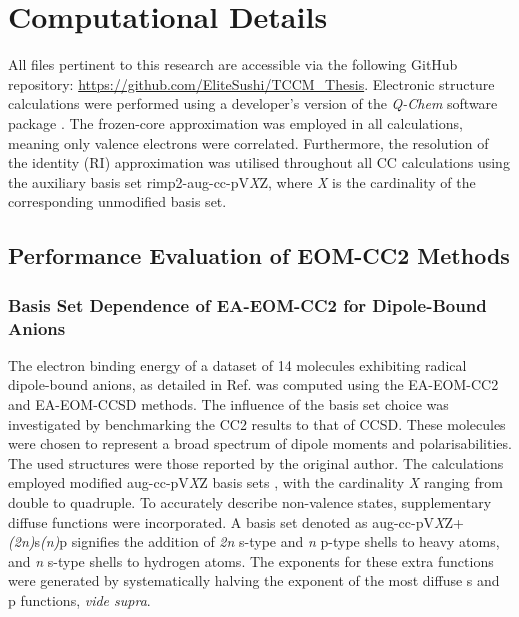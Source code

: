 \chapter{Computational Details}\label{ch:methods}

All files pertinent to this research are accessible via the following GitHub repository: \url{https://github.com/EliteSushi/TCCM_Thesis}. Electronic structure calculations were performed using a developer's version of the \textit{Q-Chem} software package \cite{QChem5}. The frozen-core approximation was employed in all calculations, meaning only valence electrons were correlated. Furthermore, the resolution of the identity (RI) approximation\cite{hattig2000cc2} was utilised throughout all CC calculations using the auxiliary basis set rimp2-aug-cc-pV\textit{X}Z, where \textit{X} is the cardinality of the corresponding unmodified basis set.\\

\section{Performance Evaluation of EOM-CC2 Methods}

\subsection{Basis Set Dependence of EA-EOM-CC2 for Dipole-Bound Anions} \label{sec:methods:basis}

The electron binding energy of a dataset of 14 molecules exhibiting radical dipole-bound anions, as detailed in Ref.  was computed using the EA-EOM-CC2 and EA-EOM-CCSD methods. The influence of the basis set choice was investigated by benchmarking the CC2 results to that of CCSD. These molecules were chosen to represent a broad spectrum of dipole moments and polarisabilities. The used structures were those reported by the original author. The calculations employed modified aug-cc-pV\textit{X}Z basis sets \cite{dunning1989gaussian}, with the cardinality \textit{X} ranging from double to quadruple. To accurately describe non-valence states, supplementary diffuse functions were incorporated. A basis set denoted as aug-cc-pV\textit{X}Z+\textit{(2n)}s\textit{(n)}p signifies the addition of \textit{2n} s-type and \textit{n} p-type shells to heavy atoms, and \textit{n} s-type shells to hydrogen atoms. The exponents for these extra functions were generated by systematically halving the exponent of the most diffuse s and p functions, \textit{vide supra}. \\

